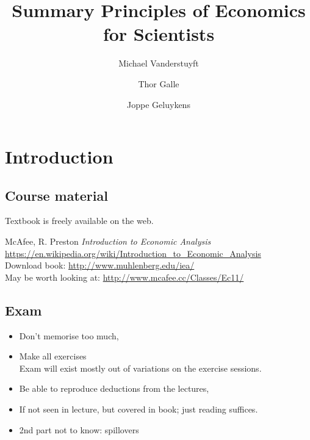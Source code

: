 \documentclass[12pt, a4paper, titlepage]{extarticle}
\begin{document}
	\title{Summary Principles of Economics for Scientists}
	\color{hdrie}
	\author{Michael Vanderstuyft \and Thor Galle \and Joppe Geluykens}
	\date{}
	\maketitle
	
	\tableofcontents
	\pagebreak
	
	\section{Introduction}
	\subsection{Course material}
	Textbook is freely available on the web.
	
	McAfee, R. Preston \textit{Introduction to Economic Analysis}\\
	\url{https://en.wikipedia.org/wiki/Introduction_to_Economic_Analysis}\\
	Download book: \url{http://www.muhlenberg.edu/iea/}\\
	May be worth looking at: \url{http://www.mcafee.cc/Classes/Ec11/}
	
	\subsection{Exam}
	
	\begin{itemize}
		\item Don't memorise too much,
		\item Make all exercises\\
				Exam will exist mostly out of variations on the exercise sessions.
		\item Be able to reproduce deductions from the lectures,
		\item If not seen in lecture, but covered in book; just reading suffices.
		\item 2nd part not to know: spillovers
	\end{itemize}
	
\end{document}
